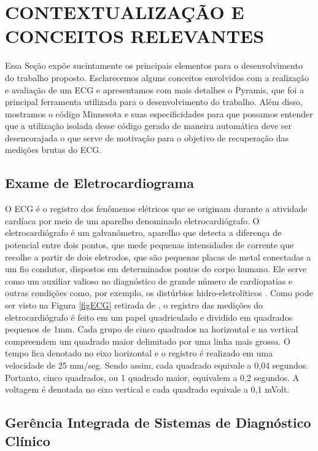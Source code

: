 \chapter{CONTEXTUALIZAÇÃO E CONCEITOS RELEVANTES}

Essa Seção expõe sucintamente os principais elementos para o desenvolvimento do trabalho proposto. Esclarecemos alguns conceitos envolvidos com a realização e avaliação de um ECG e apresentamos com mais detalhes o Pyramis, que foi a principal ferramenta utilizada para o desenvolvimento do trabalho. Além disso, mostramos o código Minnesota e suas especificidades para que possamos entender que a utilização isolada desse código gerado de maneira automática deve ser desencorajada o que serve de motivação para o objetivo de recuperação das medições brutas do ECG.


\section{Exame de Eletrocardiograma}

O ECG é o registro dos fenômenos elétricos que se originam durante a atividade cardíaca por meio de um aparelho denominado eletrocardiógrafo. O eletrocardiógrafo é um galvanômetro, aparelho que detecta a diferença de potencial entre dois pontos, que mede pequenas intensidades de corrente que recolhe a partir de dois eletrodos, que são pequenas placas de metal conectadas a um fio condutor, dispostos em determinados pontos do corpo humano. Ele serve como um auxiliar valioso no diagnóstico de grande número de cardiopatias e outras condições como, por exemplo, os distúrbios hidro-eletrolíticos \cite{Ramos2007}. Como pode ser visto na Figura \ref{figECG} retirada de \cite{Ramos2007}, o registro das medições do eletrocardiógrafo é feito em um papel quadriculado e dividido em quadrados pequenos de 1mm. Cada grupo de cinco quadrados na horizontal e na vertical compreendem um quadrado maior delimitado por uma linha mais grossa. O tempo fica denotado no eixo horizontal e o registro é realizado em uma velocidade de 25 mm/seg. Sendo assim, cada quadrado equivale a 0,04 segundos. Portanto, cinco quadrados, ou 1 quadrado maior, equivalem a 0,2 segundos. A voltagem é denotada no eixo vertical e cada quadrado equivale a 0,1 mVolt.


\section{Gerência Integrada de Sistemas de Diagnóstico Clínico}

